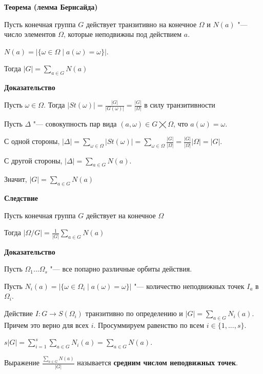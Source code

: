 \documentclass{article}
\begin{document}
\vspace{10pt}

\textbf{Теорема (лемма Бернсайда)}

Пусть конечная группа $G$ действует транзитивно на конечное $\Omega$ и $N(a)$ "--- число элементов $\Omega$, которые неподвижны под действием $a$.

$N(a) = |\{\omega \in \Omega \mid a(\omega) = \omega\}|$. 

Тогда $|G| = \sum \limits_{a \in G} N(a)$

\vspace{5pt}

\textbf{Доказательство}

Пусть $\omega \in \Omega$. Тогда $|St(\omega)| = \frac{|G|}{|G(\omega)|} = \frac{|G|}{|\Omega|}$ в силу транзитивности

Пусть $\Delta$ "--- совокупность пар вида $(a, \omega) \in G \bigtimes \Omega$, что $a(\omega) = \omega$.

С одной стороны, $|\Delta| = \sum \limits_{\omega \in \Omega} |St(\omega)| = \sum \limits_{\omega \in \Omega} \frac{|G|}{|\Omega|} = \frac{|G|}{|\Omega|}|\Omega| = |G|$.

С другой стороны, $|\Delta| = \sum \limits_{a \in G} N(a)$. 

Значит, $|G| = \sum \limits_{a \in G} N(a)$ 

\vspace{10pt}

\textbf{Следствие}

Пусть конечная группа $G$ действует на конечное $\Omega$

Тогда $|\Omega / G| = \frac{1}{|G|} \sum \limits_{a \in G} N(a)$

\textbf{Доказательство}

Пусть $\Omega_1 ... \Omega_s$ "--- все попарно различные орбиты действия.

Пусть $N_i(a) = |\{\omega \in \Omega_i \mid a(\omega) = \omega\}|$ "--- количество неподвижных точек $I_a$ в $\Omega_i$.

Действие $I : G \rightarrow S(\Omega_i)$ транзитивно по определению и $|G| = \sum \limits_{a \in G} N_i(a)$. Причем это верно для всех $i$. Просуммируем равенство по всем $i \in \{1, ..., s\}$.

$s|G| = \sum \limits_{i = 1}^s \sum \limits_{a \in G} N_i(a) = \sum \limits_{a \in G} N(a)$.

Выражение $\frac{\sum \limits_{a \in G} N(a)}{|G|}$ называется \textbf{средним числом неподвижных точек}.
\end{document}
